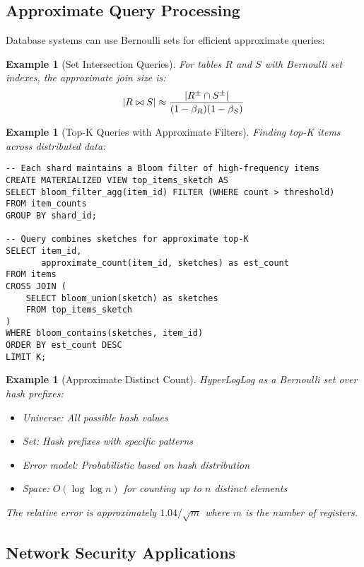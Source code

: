 \documentclass[11pt,final,hidelinks]{article}
\newtheorem{example}[theorem]{Example}
\newcommand{\setpm}[1]{#1^{\pm}} %
\newcommand{\ASet}[1]{\setpm{#1}}  %
\begin{document}
\subsection{Approximate Query Processing}

Database systems can use Bernoulli sets for efficient approximate queries:

\begin{example}[Set Intersection Queries]
For tables $R$ and $S$ with Bernoulli set indexes, the approximate join size is:
\begin{equation}
\Card{R \bowtie S} \approx \frac{\Card{\ASet{R} \cap \ASet{S}}}{(1-\fnrate_R)(1-\fnrate_S)}
\end{equation}
\end{example}

\begin{example}[Top-K Queries with Approximate Filters]
Finding top-K items across distributed data:
\begin{verbatim}
-- Each shard maintains a Bloom filter of high-frequency items
CREATE MATERIALIZED VIEW top_items_sketch AS
SELECT bloom_filter_agg(item_id) FILTER (WHERE count > threshold)
FROM item_counts
GROUP BY shard_id;

-- Query combines sketches for approximate top-K
SELECT item_id, 
       approximate_count(item_id, sketches) as est_count
FROM items
CROSS JOIN (
    SELECT bloom_union(sketch) as sketches 
    FROM top_items_sketch
)
WHERE bloom_contains(sketches, item_id)
ORDER BY est_count DESC
LIMIT K;
\end{verbatim}
\end{example}

\begin{example}[Approximate Distinct Count]
HyperLogLog as a Bernoulli set over hash prefixes:
\begin{itemize}
    \item Universe: All possible hash values
    \item Set: Hash prefixes with specific patterns
    \item Error model: Probabilistic based on hash distribution
    \item Space: $O(\log \log n)$ for counting up to $n$ distinct elements
\end{itemize}

The relative error is approximately $1.04/\sqrt{m}$ where $m$ is the number of registers.
\end{example}

\subsection{Network Security Applications}
\end{document}
